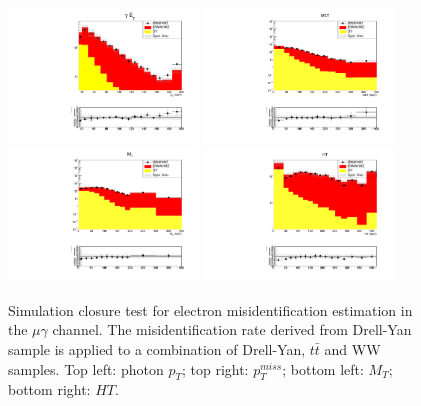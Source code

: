 \documentclass[thesis.tex]{subfiles}
\renewcommand\_{\textunderscore\allowbreak}
\begin{document}
\begin{figure}
  \centering
    \includegraphics[width=0.45\textwidth]{Figures/closure_elefakepho_PhotonEt_mg.pdf}
    \includegraphics[width=0.45\textwidth]{Figures/closure_elefakepho_MET_mg.pdf}
    \includegraphics[width=0.45\textwidth]{Figures/closure_elefakepho_MT_mg.pdf}
    \includegraphics[width=0.45\textwidth]{Figures/closure_elefakepho_HT_mg.pdf}
  \caption{Simulation closure test for electron misidentification estimation in the $\mu\gamma$ channel. The misidentification rate derived from Drell-Yan sample is applied to a combination of Drell-Yan, $t\bar{t}$ and WW samples. Top left: photon $p_T$; top right: $p_T^{miss}$; bottom left: $M_T$; bottom right: $HT$.}
  \label{fig:efakephoclosure_mg}
\end{figure}
\end{document}
